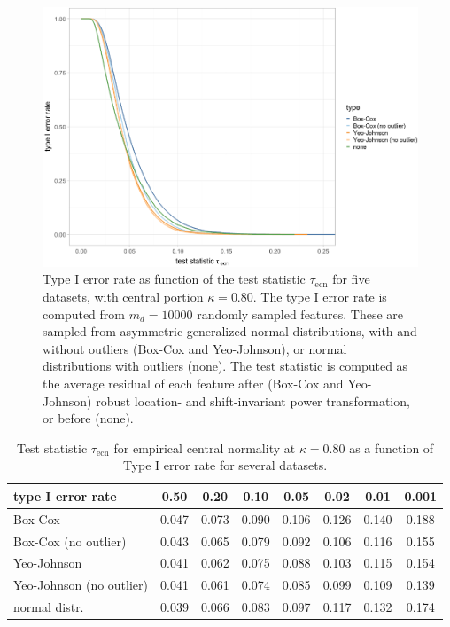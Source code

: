 \documentclass[preprint,12pt,authoryear]{elsarticle}
\begin{document}
\begin{figure}

{\centering \includegraphics[width=1\linewidth]{figure_appendix_4} 

}

\caption{Type I error rate as function of the test statistic $\tau_{\text{ecn}}$ for five datasets, with central portion $\kappa=0.80$. The type I error rate is computed from $m_d=10000$ randomly sampled features. These are sampled from asymmetric generalized normal distributions, with and without outliers (Box-Cox and Yeo-Johnson), or normal distributions with outliers (none). The test statistic is computed as the average residual of each feature after (Box-Cox and Yeo-Johnson) robust location- and shift-invariant power transformation, or before (none).}\label{fig:empirical-central-normality-test-appendix}
\end{figure}

\begin{table}
\begin{center}
\caption{Test statistic $\tau_{\text{ecn}}$ for empirical central normality at $\kappa = 0.80$ as a function of Type I error rate for several datasets.}
\label{tab:empirical-central-normality-appendix}
\begin{tabular}{l | c c c c c c c}

\toprule
type I error rate & 0.50 & 0.20 & 0.10 & 0.05 & 0.02 & 0.01 & 0.001 \\

\midrule
Box-Cox                  & 0.047 & 0.073 & 0.090 & 0.106 & 0.126 & 0.140 & 0.188 \\
Box-Cox (no outlier)     & 0.043 & 0.065 & 0.079 & 0.092 & 0.106 & 0.116 & 0.155 \\
Yeo-Johnson              & 0.041 & 0.062 & 0.075 & 0.088 & 0.103 & 0.115 & 0.154 \\
Yeo-Johnson (no outlier) & 0.041 & 0.061 & 0.074 & 0.085 & 0.099 & 0.109 & 0.139 \\
normal distr.            & 0.039 & 0.066 & 0.083 & 0.097 & 0.117 & 0.132 & 0.174 \\
\bottomrule

\end{tabular}
\end{center}
\end{table}
\end{document}
